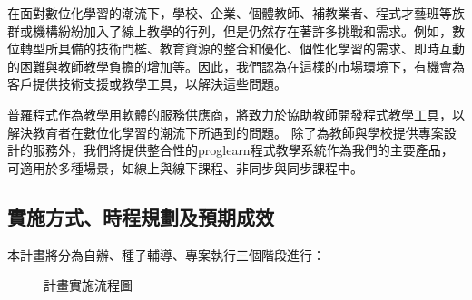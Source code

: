 在面對數位化學習的潮流下，學校、企業、個體教師、補教業者、程式才藝班等族群或機構紛紛加入了線上教學的行列，但是仍然存在著許多挑戰和需求\cite{ref:111產業產值調查報告}\cite{ref:110產業產值調查報告}。例如，數位轉型所具備的技術門檻、教育資源的整合和優化、個性化學習的需求、即時互動的困難與教師教學負擔的增加\cite{ref:老師的困難}等。因此，我們認為在這樣的市場環境下，有機會為客戶提供技術支援或教學工具，以解決這些問題。

普羅程式作為教學用軟體的服務供應商，將致力於協助教師開發程式教學工具，以解決教育者在數位化學習的潮流下所遇到的問題。
除了為教師與學校提供專案設計的服務外，我們將提供整合性的proglearn程式教學系統作為我們的主要產品，可適用於多種場景，如線上與線下課程、非同步與同步課程中。

\subsection{實施方式、時程規劃及預期成效}
\label{sec:plan}

本計畫將分為自辦、種子輔導、專案執行三個階段進行：

\begin{figure}[htbp]
  \centering
  \caption{計畫實施流程圖}
  \label{fig:flowchart}
\end{figure}

